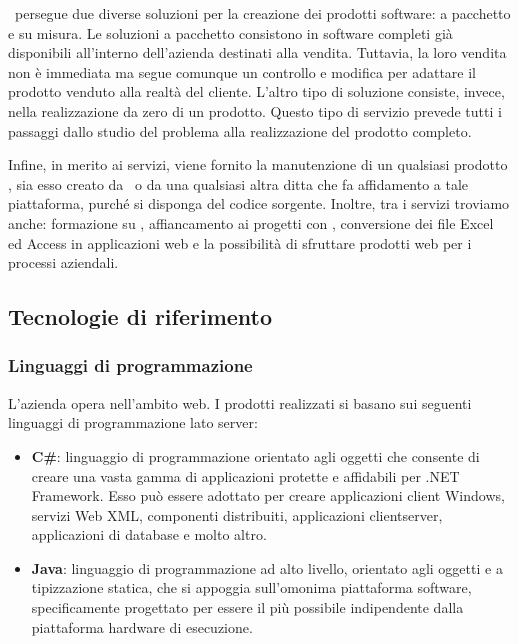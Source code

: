 \azienda\ persegue due diverse soluzioni per la creazione dei prodotti software: a pacchetto e su misura. Le soluzioni a pacchetto consistono in software completi già disponibili all'interno dell'azienda destinati alla vendita. Tuttavia, la loro vendita non è immediata ma segue comunque un controllo e modifica per adattare il prodotto venduto alla realtà del cliente. L'altro tipo di soluzione consiste, invece, nella realizzazione da zero di un prodotto. Questo tipo di servizio prevede tutti i passaggi dallo studio del problema alla realizzazione del prodotto completo.

Infine, in merito ai servizi, viene fornito la manutenzione di un qualsiasi prodotto \inde, sia esso creato da \azienda\ o da una qualsiasi altra ditta che fa affidamento a tale piattaforma, purché si disponga del codice sorgente. Inoltre, tra i servizi troviamo anche: formazione su \inde, affiancamento ai progetti con \inde, conversione dei file Excel ed Access in applicazioni web e la possibilità di sfruttare prodotti web per i processi aziendali.


\subsection{Tecnologie di riferimento}
\label{cap1:Tecnologie di riferimento}
\subsubsection*{Linguaggi di programmazione}

L'azienda opera nell'ambito web. I prodotti realizzati si basano sui seguenti linguaggi di programmazione lato server: 
\begin{itemize}
	\item \textbf{C\#}: linguaggio di programmazione orientato agli oggetti che consente di creare una vasta gamma di applicazioni protette e affidabili per .NET Framework. Esso può essere adottato per creare applicazioni client Windows, servizi Web XML, componenti distribuiti, applicazioni client\-server, applicazioni di database e molto altro.
	
	\item \textbf{Java}: linguaggio di programmazione ad alto livello, orientato agli oggetti e a tipizzazione statica, che si appoggia sull'omonima piattaforma software, specificamente progettato per essere il più possibile indipendente dalla piattaforma hardware di esecuzione.
\end{itemize}


